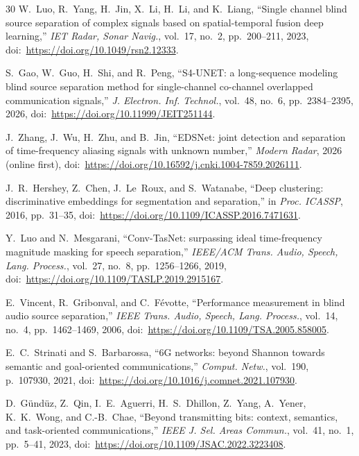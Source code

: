 \documentclass[review,12pt]{elsarticle}
\begin{document}
\begin{thebibliography}{30}
W.~Luo, R.~Yang, H.~Jin, X.~Li, H.~Li, and K.~Liang,
``Single channel blind source separation of complex signals based on
spatial-temporal fusion deep learning,''
\emph{IET Radar, Sonar Navig.}, vol.~17, no.~2, pp.~200--211, 2023,
doi:~\url{https://doi.org/10.1049/rsn2.12333}.

S.~Gao, W.~Guo, H.~Shi, and R.~Peng,
``S4-UNET: a long-sequence modeling blind source separation method for
single-channel co-channel overlapped communication signals,''
\emph{J. Electron. Inf. Technol.}, vol.~48, no.~6, pp.~2384--2395,
2026, doi:~\url{https://doi.org/10.11999/JEIT251144}.

J.~Zhang, J.~Wu, H.~Zhu, and B.~Jin,
``EDSNet: joint detection and separation of time-frequency aliasing
signals with unknown number,''
\emph{Modern Radar}, 2026 (online first),
doi:~\url{https://doi.org/10.16592/j.cnki.1004-7859.2026111}.

J.~R.~Hershey, Z.~Chen, J.~Le~Roux, and S.~Watanabe,
``Deep clustering: discriminative embeddings for segmentation and
separation,''
in \emph{Proc. ICASSP}, 2016, pp.~31--35,
doi:~\url{https://doi.org/10.1109/ICASSP.2016.7471631}.

Y.~Luo and N.~Mesgarani,
``Conv-TasNet: surpassing ideal time-frequency magnitude masking for
speech separation,''
\emph{IEEE/ACM Trans. Audio, Speech, Lang. Process.}, vol.~27, no.~8,
pp.~1256--1266, 2019,
doi:~\url{https://doi.org/10.1109/TASLP.2019.2915167}.

E.~Vincent, R.~Gribonval, and C.~F{\'e}votte,
``Performance measurement in blind audio source separation,''
\emph{IEEE Trans. Audio, Speech, Lang. Process.}, vol.~14, no.~4,
pp.~1462--1469, 2006, doi:~\url{https://doi.org/10.1109/TSA.2005.858005}.

E.~C.~Strinati and S.~Barbarossa,
``6G networks: beyond Shannon towards semantic and goal-oriented
communications,''
\emph{Comput. Netw.}, vol.~190, p.~107930, 2021,
doi:~\url{https://doi.org/10.1016/j.comnet.2021.107930}.

D.~G{\"u}nd{\"u}z, Z.~Qin, I.~E.~Aguerri, H.~S.~Dhillon, Z.~Yang,
A.~Yener, K.~K.~Wong, and C.-B.~Chae,
``Beyond transmitting bits: context, semantics, and task-oriented
communications,''
\emph{IEEE J. Sel. Areas Commun.}, vol.~41, no.~1, pp.~5--41, 2023,
doi:~\url{https://doi.org/10.1109/JSAC.2022.3223408}.


\end{thebibliography}
\end{document}
